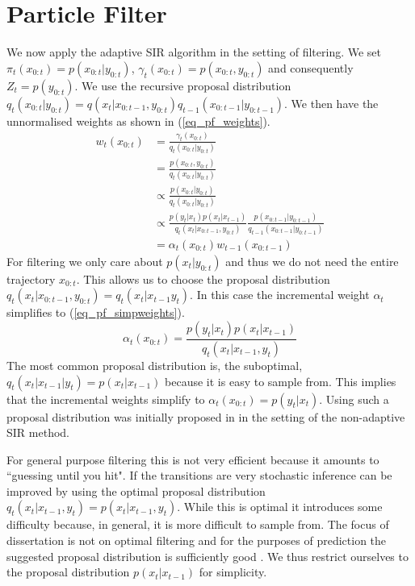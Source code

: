 \section{Particle Filter}
\label{sec_bootstrap}
We now apply the adaptive SIR algorithm in the setting of filtering. We set $\pi_t(x_{0:t}) = p(x_{0:t}|y_{0:t})$, $\gamma_t(x_{0:t}) = p(x_{0:t}, y_{0:t})$ and consequently $Z_t = p(y_{0:t})$. We use the recursive proposal distribution $q_t(x_{0:t}|y_{0:t}) = q(x_t|x_{0:t-1}, y_{0:t})q_{t-1}(x_{0:t-1}|y_{0:t-1})$. We then have the unnormalised weights as shown in (\ref{eq_pf_weights}).
\begin{equation}
\begin{aligned}
w_t(x_{0:t}) &= \frac{\gamma_t(x_{0:t})}{q_t(x_{0:t}|y_{0:t})} \\
&= \frac{p(x_{0:t}, y_{0:t})}{q_t(x_{0:t}|y_{0:t})} \\
&\propto \frac{p(x_{0:t}| y_{0:t})}{q_t(x_{0:t}|y_{0:t})} \\
&\propto \frac{p(y_t|x_t)p(x_t|x_{t-1})}{q_t(x_t|x_{0:t-1}, y_{0:t})}\frac{p(x_{0:t-1}| y_{0:t-1})}{q_{t-1}(x_{0:t-1}|y_{0:t-1})} \\
&= \alpha_t(x_{0:t})w_{t-1}(x_{0:t-1})
\end{aligned}
\label{eq_pf_weights}
\end{equation}
For filtering we only care about $p(x_t|y_{0:t})$ and thus we do not need the entire trajectory $x_{0:t}$. This allows us to choose the proposal distribution $q_t(x_t|x_{0:t-1}, y_{0:t}) = q_t(x_{t}|x_{t-1}y_{t})$. In this case the incremental weight $\alpha_t$ simplifies to (\ref{eq_pf_simpweights}).
\begin{equation}
\alpha_t(x_{0:t}) = \frac{p(y_t|x_t)p(x_t|x_{t-1})}{q_t(x_t|x_{t-1}, y_{t})} 
\label{eq_pf_simpweights}
\end{equation}
The most common proposal distribution is, the suboptimal, $q_t(x_t|x_{t-1}|y_t) = p(x_t|x_{t-1})$ because it is easy to sample from. This implies that the incremental weights simplify to $\alpha_t(x_{0:t}) = p(y_t|x_t)$. Using such a proposal distribution was initially proposed in \cite{gordon} in the setting of the non-adaptive SIR method. 

For general purpose filtering this is not very efficient because it amounts to ``guessing until you hit". If the transitions are very stochastic inference can be improved by using the optimal proposal distribution $q_t(x_t|x_{t-1}, y_t) = p(x_t|x_{t-1}, y_t)$. While this is optimal it introduces some difficulty because, in general, it is more difficult to sample from. The focus of dissertation is not on optimal filtering and for the purposes of prediction the suggested proposal distribution is sufficiently good \cite{murphy1}. We thus restrict ourselves to the proposal distribution $p(x_t|x_{t-1})$ for simplicity.

